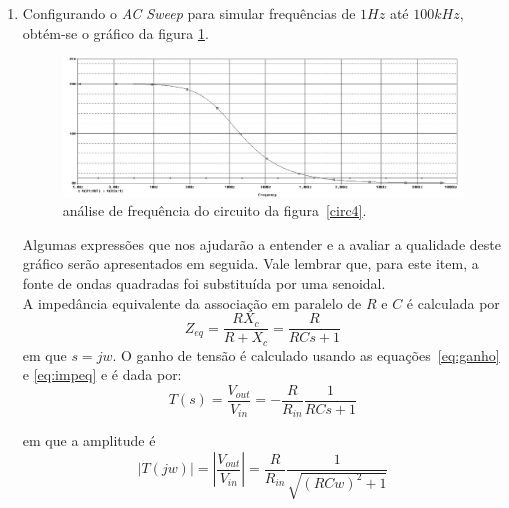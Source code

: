 \documentclass[12pt, a4paper]{article}
\begin{document}
\begin{enumerate}
            \item
            
            Configurando o \textit{AC Sweep} para simular frequências de \(1Hz\) até \(100kHz\), obtém-se o gráfico da figura \ref{waves5}.
            
            \begin{figure}[h!] 
                \centering
                \includegraphics[width=1\textwidth]{waves5}
                \caption{análise de frequência do circuito da figura~\ref{circ4}.}        
                \label{waves5}
            \end{figure}
            
            Algumas expressões que nos ajudarão a entender e a avaliar a qualidade deste gráfico serão apresentados em seguida. Vale lembrar que, para este item, a fonte de ondas quadradas foi substituída por uma senoidal.\\
            
            A impedância equivalente da associação em paralelo de \(R\) e \(C\) é calculada por 
            \begin{equation} \label{eq:impeq}
            Z_{eq}=\frac{RX_c}{R+X_c}=\frac{R}{RCs+1}
            \end{equation} 
            em que \(s=jw\).
            O ganho de tensão é calculado usando as equações~\ref{eq:ganho} e \ref{eq:impeq} e é dada por:
            \begin{equation} \label{eq:ganho4}
            T(s)=\frac{V_{out}}{V_{in}} = -\frac{R}{R_{in}}\frac{1}{RCs+1}
            \end{equation}
            
            em que a amplitude é
            \begin{equation} \label{eq:amp4}
            \left|T(jw)\right|= \left|\frac{V_{out}}{V_{in}}\right| = \frac{R}{R_{in}}\frac{1}{\sqrt{(RCw)^2+1}}
            \end{equation}
            
            
            

\end{enumerate}
\end{document}
